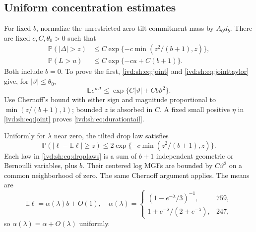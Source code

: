 \documentclass[11pt,letterpaper]{article}
\theoremstyle{remark}\newtheorem{remark}[theorem]{Remark}
\numberwithin{equation}{section}
\newcommand{\Prob}{\mathbb P}\newcommand{\E}{\mathbb E}
\begin{document}
\subsection{Uniform concentration estimates}
For fixed $b$, normalize the unrestricted zero-tilt commitment mass
by $A_0d_b$. There are fixed $c,C,\theta_0>0$ such that
\begin{align}
 \Prob(|\Delta|>z)&\le C\exp\{-c\min(z^2/(b+1),z)\},
 \label{ivd:sh:eq:deltatail}\\
 \Prob(L>u)&\le C\exp\{-cu+C(b+1)\}.
 \label{ivd:sh:eq:durationtail}
\end{align}
Both include $b=0$. To prove the first, \eqref{ivd:sh:eq:joint} and
\eqref{ivd:sh:eq:jointtaylor} give, for $|\vartheta|\le\theta_0$,
\[
 \E e^{\vartheta\Delta}\le
 \exp\{C|\vartheta|+Cb\vartheta^2\}.
\]
Use Chernoff's bound with either sign and magnitude proportional to
$\min(z/(b+1),1)$; bounded $z$ is absorbed in $C$.
A fixed small positive $\eta$ in \eqref{ivd:sh:eq:joint} proves
\eqref{ivd:sh:eq:durationtail}.

Uniformly for $\lambda$ near zero, the tilted drop law satisfies
\begin{equation}\label{ivd:sh:eq:droptail}
 \Prob(|\ell-\E\ell|\ge z)
 \le 2\exp\{-c\min(z^2/(b+1),z)\}.
\end{equation}
Each law in \eqref{ivd:sh:eq:droplaws} is a sum of $b+1$ independent
geometric or Bernoulli variables, plus $b$. Their centered log MGFs
are bounded by $C\vartheta^2$ on a common neighborhood of zero.
The same Chernoff argument applies. The means are
\begin{equation}\label{ivd:sh:eq:dropmean}
 \E\ell=\alpha(\lambda)b+O(1),\quad
 \alpha(\lambda)=\begin{cases}
 (1-e^{-\lambda}/3)^{-1},&759,\\
 1+e^{-\lambda}/(2+e^{-\lambda}),&247,
 \end{cases}
\end{equation}
so $\alpha(\lambda)=\alpha+O(\lambda)$ uniformly.
\end{document}
